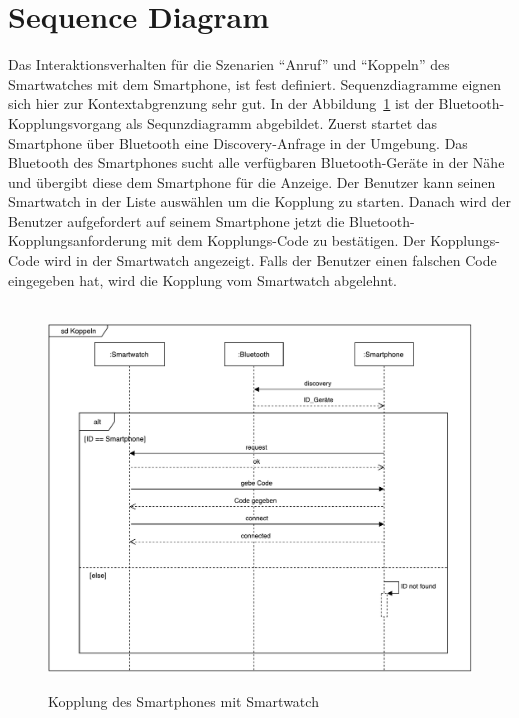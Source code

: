 \section{Sequence Diagram}
Das Interaktionsverhalten für die Szenarien ``Anruf'' und ``Koppeln'' des Smartwatches mit dem Smartphone, ist fest definiert. Sequenzdiagramme eignen sich hier zur Kontextabgrenzung sehr gut.
In der Abbildung~\ref{fig:kopplung} ist der Bluetooth-Kopplungsvorgang als Sequnzdiagramm abgebildet.
Zuerst startet das Smartphone über Bluetooth eine Discovery-Anfrage in der Umgebung.
Das Bluetooth des Smartphones sucht alle verfügbaren Bluetooth-Geräte in der Nähe und übergibt diese dem Smartphone für die Anzeige.
Der Benutzer kann seinen Smartwatch in der Liste auswählen um die Kopplung zu starten.
Danach wird der Benutzer aufgefordert auf seinem Smartphone jetzt die Bluetooth-Kopplungsanforderung mit dem Kopplungs-Code zu bestätigen. Der Kopplungs-Code wird in der Smartwatch angezeigt.
Falls der Benutzer einen falschen Code eingegeben hat, wird die Kopplung vom Smartwatch
abgelehnt.
\begin{figure}[h]
\centering\
\includegraphics[width=14cm]{img/KoppelnSequenz}
\caption{Kopplung des Smartphones mit Smartwatch}\label{fig:kopplung}
\end{figure}


